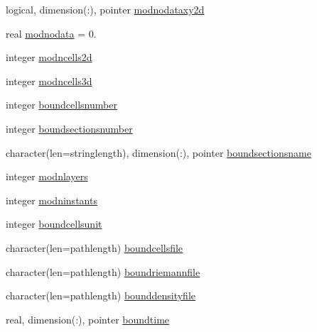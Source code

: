 \begin{DoxyCompactItemize}
\item 
logical, dimension(\+:), pointer \mbox{\hyperlink{structmoduledelft3d__2__mohid_1_1t__delft3d__2__mohid_ad75af2c5b7489ccc62f8754324e79919}{modnodataxy2d}}
\item 
real \mbox{\hyperlink{structmoduledelft3d__2__mohid_1_1t__delft3d__2__mohid_a3629e62539d89826466ea828fcbec612}{modnodata}} = 0.
\item 
integer \mbox{\hyperlink{structmoduledelft3d__2__mohid_1_1t__delft3d__2__mohid_abbd7439b94ef82dd9544d298f7b19cd9}{modncells2d}}
\item 
integer \mbox{\hyperlink{structmoduledelft3d__2__mohid_1_1t__delft3d__2__mohid_a7e917b93470fae023a776b02fd579aed}{modncells3d}}
\item 
integer \mbox{\hyperlink{structmoduledelft3d__2__mohid_1_1t__delft3d__2__mohid_a66ad8bd12fcb5f613cbccc4192aad7b1}{boundcellsnumber}}
\item 
integer \mbox{\hyperlink{structmoduledelft3d__2__mohid_1_1t__delft3d__2__mohid_a56fcd5e71d191033d59b714c780a7add}{boundsectionsnumber}}
\item 
character(len=stringlength), dimension(\+:), pointer \mbox{\hyperlink{structmoduledelft3d__2__mohid_1_1t__delft3d__2__mohid_af61532fd254775995befe64ec83f62b6}{boundsectionsname}}
\item 
integer \mbox{\hyperlink{structmoduledelft3d__2__mohid_1_1t__delft3d__2__mohid_a0b43a9e808eeb7d60845758a45207b36}{modnlayers}}
\item 
integer \mbox{\hyperlink{structmoduledelft3d__2__mohid_1_1t__delft3d__2__mohid_a9cd7b15688c90970c89ca9cd16c6108b}{modninstants}}
\item 
integer \mbox{\hyperlink{structmoduledelft3d__2__mohid_1_1t__delft3d__2__mohid_a93ea48221bf912bdb1622210e2ac8234}{boundcellsunit}}
\item 
character(len=pathlength) \mbox{\hyperlink{structmoduledelft3d__2__mohid_1_1t__delft3d__2__mohid_a813cf804f19cae515b6372ee70718432}{boundcellsfile}}
\item 
character(len=pathlength) \mbox{\hyperlink{structmoduledelft3d__2__mohid_1_1t__delft3d__2__mohid_ad4e6c1f4ae10b14b510d1a260ea04c1c}{boundriemannfile}}
\item 
character(len=pathlength) \mbox{\hyperlink{structmoduledelft3d__2__mohid_1_1t__delft3d__2__mohid_ac3f9e54736cf1ea6678948250ecbd401}{bounddensityfile}}
\item 
real, dimension(\+:), pointer \mbox{\hyperlink{structmoduledelft3d__2__mohid_1_1t__delft3d__2__mohid_ace2b1ff4b38a797818501fa24875ea95}{boundtime}}

\end{DoxyCompactItemize}
